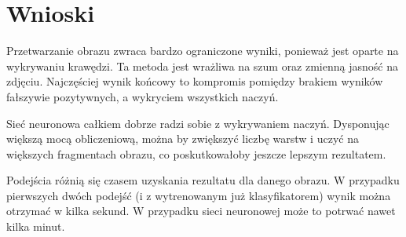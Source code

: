 \documentclass[polish,polish,a4paper]{article}
\begin{document}





	
	\section{Wnioski}
	
	Przetwarzanie obrazu zwraca bardzo ograniczone wyniki,
	 ponieważ jest oparte na wykrywaniu krawędzi.
	 Ta metoda jest wrażliwa na szum oraz zmienną jasność na zdjęciu.
	 Najczęściej wynik końcowy to kompromis
	 pomiędzy brakiem wyników fałszywie pozytywnych, 
	 a wykryciem wszystkich naczyń.
	
	Sieć neuronowa całkiem dobrze radzi sobie z wykrywaniem naczyń.
	Dysponując większą mocą obliczeniową,
	można by zwiększyć liczbę warstw i uczyć na większych fragmentach obrazu,
	co poskutkowałoby jeszcze lepszym rezultatem.
	
	Podejścia różnią się czasem uzyskania rezultatu dla danego obrazu.
	W przypadku pierwszych dwóch podejść
	(i z wytrenowanym już klasyfikatorem) wynik można otrzymać
	w kilka sekund. W przypadku sieci neuronowej może to potrwać nawet kilka minut.
		
\end{document}
